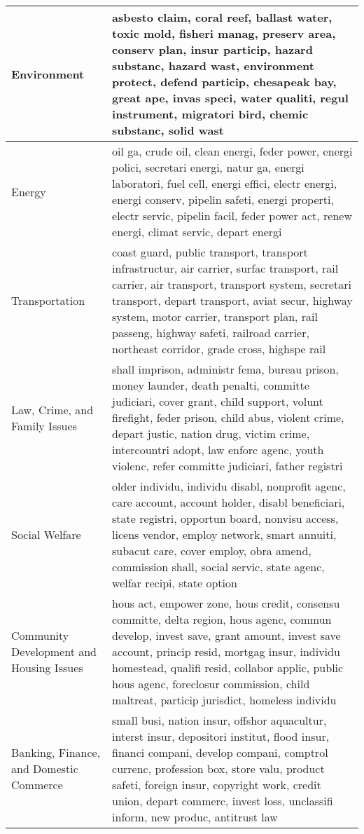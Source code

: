 \begin{longtable}{p{}p{}}
   \hline
Environment & asbesto claim, coral reef, ballast water, toxic mold, fisheri manag, preserv area, conserv plan, insur particip, hazard substanc, hazard wast, environment protect, defend particip, chesapeak bay, great ape, invas speci, water qualiti, regul instrument, migratori bird, chemic substanc, solid wast \\ 
   \hline
Energy & oil ga, crude oil, clean energi, feder power, energi polici, secretari energi, natur ga, energi laboratori, fuel cell, energi effici, electr energi, energi conserv, pipelin safeti, energi properti, electr servic, pipelin facil, feder power act, renew energi, climat servic, depart energi \\ 
   \hline
Transportation & coast guard, public transport, transport infrastructur, air carrier, surfac transport, rail carrier, air transport, transport system, secretari transport, depart transport, aviat secur, highway system, motor carrier, transport plan, rail passeng, highway safeti, railroad carrier, northeast corridor, grade cross, highspe rail \\ 
   \hline
Law, Crime, and Family Issues & shall imprison, administr fema, bureau prison, money launder, death penalti, committe judiciari, cover grant, child support, volunt firefight, feder prison, child abus, violent crime, depart justic, nation drug, victim crime, intercountri adopt, law enforc agenc, youth violenc, refer committe judiciari, father registri \\ 
   \hline
Social Welfare & older individu, individu disabl, nonprofit agenc, care account, account holder, disabl beneficiari, state registri, opportun board, nonvisu access, licens vendor, employ network, smart annuiti, subacut care, cover employ, obra amend, commission shall, social servic, state agenc, welfar recipi, state option \\ 
   \hline
Community Development and Housing Issues & hous act, empower zone, hous credit, consensu committe, delta region, hous agenc, commun develop, invest save, grant amount, invest save account, princip resid, mortgag insur, individu homestead, qualifi resid, collabor applic, public hous agenc, foreclosur commission, child maltreat, particip jurisdict, homeless individu \\ 
   \hline
Banking, Finance, and Domestic Commerce & small busi, nation insur, offshor aquacultur, interst insur, depositori institut, flood insur, financi compani, develop compani, comptrol currenc, profession box, store valu, product safeti, foreign insur, copyright work, credit union, depart commerc, invest loss, unclassifi inform, new produc, antitrust law \\ 

\end{longtable}
